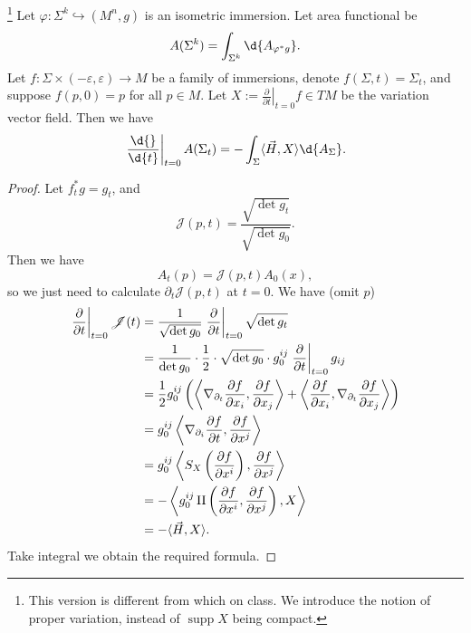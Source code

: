 \begin{prop}
    \footnote{This version is different from which on class. We introduce the notion of proper variation, instead of $\operatorname{supp}X$ being compact.}
    Let $\varphi:\Sigma^k\hookrightarrow(M^n,g)$ is an isometric immersion.
    Let area functional be
    \[A(\Sigma^k)=\int_{\Sigma^k}\d{A_{\varphi^*g}}.\]
    Let $f:\Sigma\times(-\varepsilon,\varepsilon)\to M$ be a family of immersions, denote $f(\Sigma,t)=\Sigma_t$, and suppose $f(p,0)=p$ for all $p\in M$.
    Let $X:=\left.\frac{\partial{}}{\partial{t}}\right|_{t=0}f\in TM$ be the variation vector field.
    Then we have
    \[\left.\frac{\d{}}{\d{t}}\right|_{t=0}A(\Sigma_t)=-\int_\Sigma\langle\vec{H},X\rangle\d{A_\Sigma}.\]
\end{prop}
\begin{proof}
    Let $f^*_tg=g_t$, and
    \[\mathscr{J}(p,t)=\frac{\sqrt{\det{g_t}}}{\sqrt{\det{g_0}}}.\]
    Then we have
    \[A_t(p)=\mathscr{J}(p,t)A_0(x),\]
    so we just need to calculate $\partial_t\mathscr{J}(p,t)$ at $t=0$.
    We have (omit $p$)
    \begin{align*}
        \left.\frac{\partial{}}{\partial{t}}\right|_{t=0}\mathscr{J}(t)&=\frac{1}{\sqrt{\det{g_0}}}\left.\frac{\partial}{\partial{t}}\right|_{t=0}\sqrt{\det{g_t}}\\
        &=\frac{1}{\det{g_0}}\cdot\frac{1}{2}\cdot\sqrt{\det{g_0}}\cdot g^{ij}_0\left.\frac{\partial{}}{\partial{t}}\right|_{t=0}g_{ij}\\
        &=\frac{1}{2}g_0^{ij}\left(\left\langle\nabla_{\partial_t}\frac{\partial{f}}{\partial{x_i}},\frac{\partial{f}}{\partial{x_j}}\right\rangle+\left\langle\frac{\partial{f}}{\partial{x_i}},\nabla_{\partial_t}\frac{\partial{f}}{\partial{x_j}}\right\rangle\right)\\
        &=g^{ij}_0\left\langle\nabla_{\partial_i}\frac{\partial{f}}{\partial{t}},\frac{\partial{f}}{\partial{x^j}}\right\rangle\\
        &=g^{ij}_0\left\langle S_{X}\left(\frac{\partial{f}}{\partial{x^i}}\right),\frac{\partial{f}}{\partial{x^j}}\right\rangle\\
        &=-\left\langle g^{ij}_0\operatorname{II}\left(\frac{\partial{f}}{\partial{x^i}},\frac{\partial{f}}{\partial{x^j}}\right),X\right\rangle\\
        &=-\langle \vec{H},X\rangle.
    \end{align*}
    Take integral we obtain the required formula.
\end{proof}

